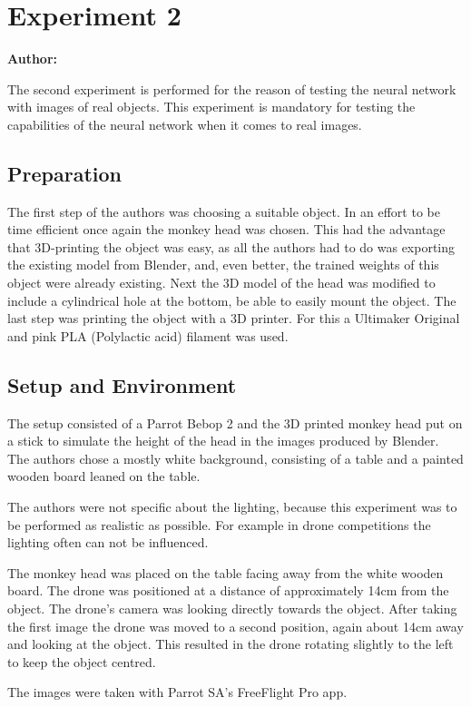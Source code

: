 \chapter{Experiment 2}

\textbf{Author: } 

The second experiment is performed for the reason of testing the neural network with images of real objects. This experiment is mandatory for testing the capabilities of the neural network when it comes to real images.

\section{Preparation}
The first step of the authors was choosing a suitable object. In an effort to be time efficient once again the monkey head was chosen. This had the advantage that 3D-printing the object was easy, as all the authors had to do was exporting the existing model from Blender, and, even better, the trained weights of this object were already existing. Next the 3D model of the head was modified to include a cylindrical hole at the bottom, be able to easily mount the object. The last step was printing the object with a 3D printer. For this a Ultimaker Original and pink PLA (Polylactic acid) filament was used.

\section{Setup and Environment}
The setup consisted of a Parrot Bebop 2 and the 3D printed monkey head put on a stick to simulate the height of the head in the images produced by Blender. The authors chose a mostly white background, consisting of a table and a painted wooden board leaned on the table.

The authors were not specific about the lighting, because this experiment was to be performed as realistic as possible. For example in drone competitions the lighting often can not be influenced.

The monkey head was placed on the table facing away from the white wooden board. The drone was positioned at a distance of approximately 14cm from the object. The drone's camera was looking directly towards the object. After taking the first image the drone was moved to a second position, again about 14cm away and looking at the object. This resulted in the drone rotating slightly to the left to keep the object centred.

The images were taken with Parrot SA's FreeFlight Pro app.

